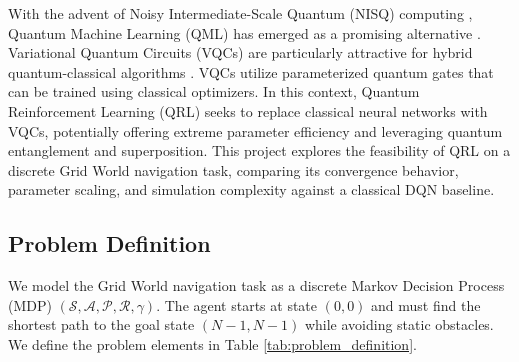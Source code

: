 \documentclass[12pt, a4paper]{article}
\begin{document}
With the advent of Noisy Intermediate-Scale Quantum (NISQ) computing \cite{preskill2018}, Quantum Machine Learning (QML) has emerged as a promising alternative \cite{biamonte2017}. Variational Quantum Circuits (VQCs) are particularly attractive for hybrid quantum-classical algorithms \cite{cerezo2021}. VQCs utilize parameterized quantum gates that can be trained using classical optimizers. In this context, Quantum Reinforcement Learning (QRL) seeks to replace classical neural networks with VQCs, potentially offering extreme parameter efficiency and leveraging quantum entanglement and superposition. This project explores the feasibility of QRL on a discrete Grid World navigation task, comparing its convergence behavior, parameter scaling, and simulation complexity against a classical DQN baseline.



\subsection{Problem Definition}

We model the Grid World navigation task as a discrete Markov Decision Process (MDP) $(\mathcal{S}, \mathcal{A}, \mathcal{P}, \mathcal{R}, \gamma)$. The agent starts at state $(0,0)$ and must find the shortest path to the goal state $(N-1, N-1)$ while avoiding static obstacles. We define the problem elements in Table \ref{tab:problem_definition}.
\end{document}
